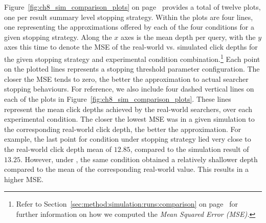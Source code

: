 Figure~\ref{fig:ch8_sim_comparison_plots} on page~\pageref{fig:ch8_sim_comparison_plots} provides a total of twelve plots, one per result summary level stopping strategy. Within the plots are four lines, one representing the approximations offered by each of the four conditions for a given stopping strategy. Along the $x$ axes is the mean depth per query, with the $y$ axes this time to denote the MSE of the real-world vs. simulated click depths for the given stopping strategy and experimental condition combination.\footnote{Refer to Section~\ref{sec:method:simulation:runs:comparison} on page~\pageref{sec:method:simulation:runs:comparison} for further information on how we computed the \emph{Mean Squared Error (MSE).}} Each point on the plotted lines represents a stopping threshold parameter configuration. The closer the MSE tends to zero, the better the approximation to actual searcher stopping behaviours. For reference, we also include four dashed vertical lines on each of the plots in Figure~\ref{fig:ch8_sim_comparison_plots}. These lines represent the mean click depths achieved by the real-world searchers, over each experimental condition. The closer the lowest MSE was in a given simulation to the corresponding real-world click depth, the better the approximation. For example, the last point for condition  under stopping strategy  lied very close to the real-world click depth mean of $12.85$, compared to the simulation result of $13.25$. However, under , the same condition obtained a relatively shallower depth compared to the mean of the corresponding real-world value. This results in a higher MSE.

